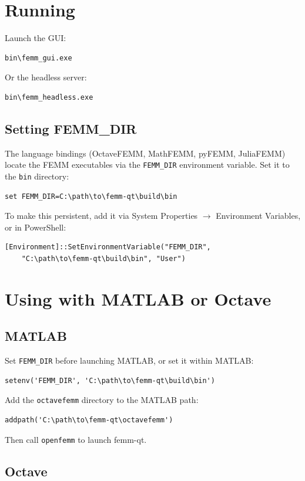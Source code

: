 \documentclass[11pt]{article}
\begin{document}
\section{Running}

Launch the GUI:
\begin{lstlisting}
bin\femm_gui.exe
\end{lstlisting}

Or the headless server:
\begin{lstlisting}
bin\femm_headless.exe
\end{lstlisting}

\subsection{Setting FEMM\_DIR}

The language bindings (OctaveFEMM, MathFEMM, pyFEMM, JuliaFEMM) locate
the FEMM executables via the \texttt{FEMM\_DIR} environment variable.
Set it to the \texttt{bin} directory:
\begin{lstlisting}
set FEMM_DIR=C:\path\to\femm-qt\build\bin
\end{lstlisting}
To make this persistent, add it via System Properties $\rightarrow$
Environment Variables, or in PowerShell:
\begin{lstlisting}
[Environment]::SetEnvironmentVariable("FEMM_DIR",
    "C:\path\to\femm-qt\build\bin", "User")
\end{lstlisting}

\section{Using with MATLAB or Octave}

\subsection{MATLAB}

Set \texttt{FEMM\_DIR} before launching MATLAB, or set it within MATLAB:
\begin{lstlisting}
setenv('FEMM_DIR', 'C:\path\to\femm-qt\build\bin')
\end{lstlisting}
Add the \texttt{octavefemm} directory to the MATLAB path:
\begin{lstlisting}
addpath('C:\path\to\femm-qt\octavefemm')
\end{lstlisting}
Then call \texttt{openfemm} to launch femm-qt.

\subsection{Octave}
\end{document}
